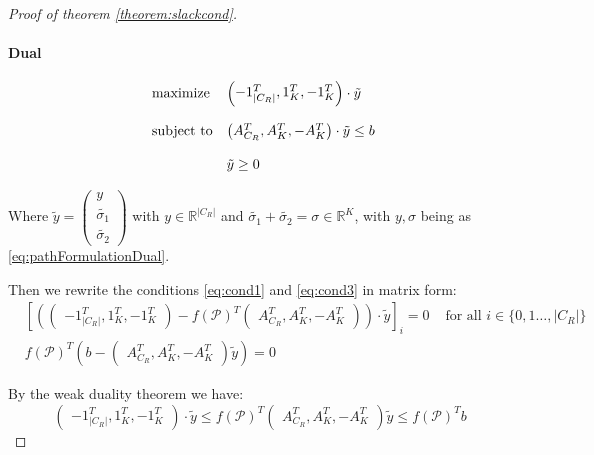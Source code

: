 \documentclass[14pt,a4paper]{article}
\theoremstyle{definition}
\numberwithin{equation}{subsection}
\begin{document}
\begin{proof}[Proof of theorem \ref{theorem:slackcond}]
 

 
 \paragraph{Dual}
 \begin{equation*}
 \begin{array}{ll@{}ll}
 \text{maximize}  &\left( \begin{matrix} -1_{|C_R|}^T, 1_K^T, -1_K^T  \end{matrix} \right)\cdot \tilde{y}   \\
 \\
 \text{subject to} 
 &\left( \begin{matrix} A_{C_R}^T, A_K^T, -A_K^T \end{matrix} \right) \cdot \tilde{y} \leq  b  \\
 \\
 &\tilde{y} \geq 0
 \end{array}
 \label{eq:matrixformdual}
 \end{equation*}
 
 Where $\tilde{y} =\left( \begin{matrix} y \\ \tilde{\sigma_1} \\ \tilde{\sigma_2}  \end{matrix} \right) $ with $y \in \mathbb{R}^{|C_R|}$  and $\tilde{\sigma_1} + \tilde{\sigma_2} = \sigma \in \mathbb{R}^{K}$, with $y,\sigma$ being as \eqref{eq:pathFormulationDual}.

 
 Then we rewrite the conditions \eqref{eq:cond1} and \eqref{eq:cond3} in matrix form:
\begin{align*}
&\left[ \left( \left( \begin{matrix} -1_{|C_R|}^T, 1_K^T, -1_K^T  \end{matrix} \right) - f(\mathcal{P})^T\left( \begin{matrix} A_{C_R}^T, A_K^T, -A_K^T \end{matrix} \right) \right) \cdot \tilde{y}\right]_{i}= 0 & \text{ for all } i \in \{0,1\ldots,|C_R| \}\\
& f(\mathcal{P})^T\left( b - \left( \begin{matrix} A_{C_R}^T, A_K^T, -A_K^T \end{matrix} \right)\tilde{y} \right) = 0 &
\end{align*}
 
 
 By the weak duality theorem we have: 
 $$\left( \begin{matrix} -1_{|C_R|}^T, 1_K^T, -1_K^T  \end{matrix} \right)\cdot \tilde{y} \leq  
 f(\mathcal{P})^T \left( \begin{matrix} A_{C_R}^T, A_K^T, -A_K^T \end{matrix} \right)\tilde{y} \leq f(\mathcal{P})^Tb $$
 

\end{proof}
\end{document}
